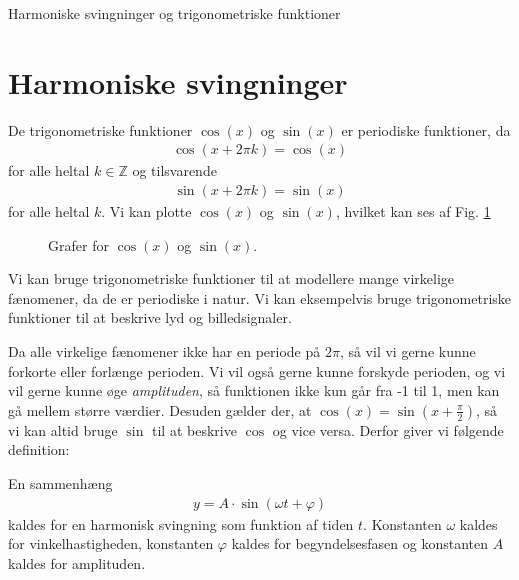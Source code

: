 \documentclass[12pt]{article}
\begin{document}


\begin{center}
\Huge
Harmoniske svingninger og trigonometriske funktioner
\end{center}

\section*{Harmoniske svingninger}

De trigonometriske funktioner $\cos(x)$ og $\sin(x)$ er periodiske funktioner, da 
\begin{align*}
\cos(x + 2\pi k) = \cos(x) 
\end{align*}
for alle heltal $k\in \mathbb{Z}$ og tilsvarende
\begin{align*}
\sin(x + 2\pi k) = \sin(x)
\end{align*}
for alle heltal $k$. Vi kan plotte $\cos(x)$ og $\sin(x)$, hvilket kan ses af Fig. \ref{fig:trig}
\begin{figure}[H]
\centering
{}
\caption{Grafer for $\cos(x)$ og $\sin(x)$.}
\label{fig:trig}
\end{figure}
Vi kan bruge trigonometriske funktioner til at modellere mange virkelige fænomener, da de er periodiske i natur. Vi kan eksempelvis bruge trigonometriske funktioner til at beskrive lyd og billedsignaler.

Da alle virkelige fænomener ikke har en periode på $2\pi$, så vil vi gerne kunne forkorte eller forlænge perioden. Vi vil også gerne kunne forskyde perioden, og vi vil gerne kunne øge \textit{amplituden}, så funktionen ikke kun går fra -1 til 1, men kan gå mellem større værdier. Desuden gælder der, at $\cos(x) = \sin(x + \frac{\pi}{2})$, så vi kan altid bruge $\sin$ til at beskrive $\cos$ og vice versa. Derfor giver vi følgende definition:
\begin{defn}
En sammenhæng 
\begin{align*}
y = A\cdot \sin(\omega t + \varphi)
\end{align*}
kaldes for en harmonisk svingning som funktion af tiden $t$. Konstanten $\omega$ kaldes for vinkelhastigheden, konstanten $\varphi$ kaldes for begyndelsesfasen og konstanten $A$ kaldes for amplituden. 
\end{defn}
\end{document}
